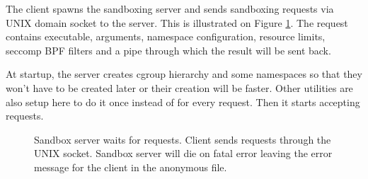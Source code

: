 \documentclass[en]{pracamgr}
\begin{document}
The client spawns the sandboxing server and sends sandboxing requests via UNIX domain socket to the server. This is illustrated on Figure \ref{fig:server_waits_for_request}. The request contains executable, arguments, namespace configuration, resource limits, seccomp BPF filters and a pipe through which the result will be sent back.

At startup, the server creates cgroup hierarchy and some namespaces so that they won't have to be created later or their creation will be faster. Other utilities are also setup here to do it once instead of for every request. Then it starts accepting requests.

\begin{figure}[h]
\tikzset{>=latex} %
\centering
{}
\caption{Sandbox server waits for requests. Client sends requests through the UNIX socket. Sandbox server will die on fatal error leaving the error message for the client in the anonymous file.}
\label{fig:server_waits_for_request}
\end{figure}
\end{document}
